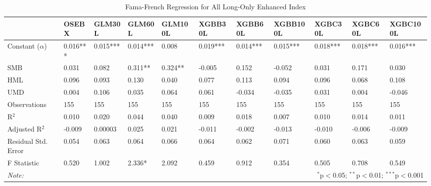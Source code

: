 \begin{table}
\centering 
  \caption{Fama-French Regression for All Long-Only Enhanced Index} 
  \vspace{1em}
  \label{table:enhanced-models_with_L-all} 
\begin{tabularx}{\textwidth}{lXXXXXXXXXX} 
\toprule
 & OSEBX & GLM30L & GLM60L & GLM100L & XGBB30L & XGBB60L & XGBB100L & XGBC30L & XGBC60L & XGBC100L \\ 
\midrule
 Constant ($\alpha$) & 0.016*** & 0.015*** & 0.014*** & 0.008 & 0.019*** & 0.014*** & 0.015*** & 0.018*** & 0.018*** & 0.016*** \\ 
 SMB & 0.031 & 0.082 & 0.311** & 0.324** & -0.005 & 0.152 & -0.052 & 0.031 & 0.171 & 0.030 \\ 
 HML & 0.096 & 0.093 & 0.130 & 0.040 & 0.077 & 0.113 & 0.094 & 0.096 & 0.068 & 0.108 \\ 
 UMD & 0.004 & 0.106 & 0.035 & 0.064 & 0.061 & -0.034 & -0.035 & 0.031 & 0.004 & -0.046 \\ 
\midrule
 Observations & 155 & 155 & 155 & 155 & 155 & 155 & 155 & 155 & 155 & 155 \\ 
 R$^{2}$ & 0.010 & 0.020 & 0.044 & 0.040 & 0.009 & 0.018 & 0.007 & 0.010 & 0.014 & 0.011 \\ 
 Adjusted R$^{2}$ & -0.009 & 0.00003 & 0.025 & 0.021 & -0.011 & -0.002 & -0.013 & -0.010 & -0.006 & -0.009 \\ 
 Residual Std. Error & 0.054 & 0.063 & 0.064 & 0.066 & 0.064 & 0.062 & 0.071 & 0.060 & 0.063 & 0.059 \\ 
 F Statistic & 0.520 & 1.002 & 2.336* & 2.092 & 0.459 & 0.912 & 0.354 & 0.505 & 0.708 & 0.549 \\ 
\bottomrule 
\textit{Note:} & \multicolumn{10}{r}{$^{*}$p$<$0.05; $^{**}$p$<$0.01; $^{***}$p$<$0.001} \\ 
\end{tabularx} 
\end{table}

